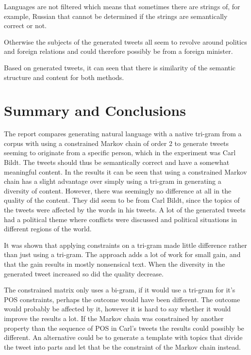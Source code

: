 \documentclass[a4paper,12pt]{article}
\begin{document}
Languages are not filtered which means that sometimes there are strings of, for example, Russian that cannot be determined if the strings are semantically correct or not.

Otherwise the subjects of the generated tweets all seem to revolve around politics and foreign relations and could therefore possibly be from a foreign minister.

Based on generated tweets, it can seen that there is similarity of the semantic structure and content for both methods. 

\newpage
\section{Summary and Conclusions}
\label{sec:summary}
The report compares generating natural language with a native tri-gram from a corpus with using a constrained Markov chain of order 2 to generate tweets seeming to originate from a specific person, which in the experiment was Carl Bildt. 
The tweets should thus be semantically correct and have a somewhat meaningful content.
In the results it can be seen that using a constrained Markov chain has a slight advantage over simply using a tri-gram in generating a diversity of content. 
However, there was seemingly no difference at all in the quality of the content. 
They did seem to be from Carl Bildt, since the topics of the tweets were affected by the words in his tweets. 
A lot of the generated tweets had a political theme where conflicts were discussed and political situations in different regions of the world. 


It was shown that applying constraints on a tri-gram made little difference rather than just using a tri-gram. The approach adds a lot of work for small gain, and that the gain results in mostly nonsensical text. When the diversity in the generated tweet increased so did the quality decrease.

The constrained matrix only uses a bi-gram, if it would use a tri-gram for it's POS constraints, perhaps the outcome would have been different. The outcome would probably be affected by it, however it is hard to say whether it would improve the results a lot. If the Markov chain was constrained by another property than the sequence of POS in Carl's tweets the results could possibly be different. An alternative could be to generate a template with topics that divide the tweet into parts and let that be the constraint of the Markov chain instead.



\newpage

\end{document}
